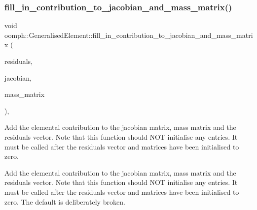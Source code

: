 \subsubsection{\texorpdfstring{fill\+\_\+in\+\_\+contribution\+\_\+to\+\_\+jacobian\+\_\+and\+\_\+mass\+\_\+matrix()}{fill\_in\_contribution\_to\_jacobian\_and\_mass\_matrix()}}
{\footnotesize\ttfamily void oomph\+::\+Generalised\+Element\+::fill\+\_\+in\+\_\+contribution\+\_\+to\+\_\+jacobian\+\_\+and\+\_\+mass\+\_\+matrix (\begin{DoxyParamCaption}\item[{\hyperlink{classoomph_1_1Vector}{Vector}$<$ double $>$ \&}]{residuals,  }\item[{\hyperlink{classoomph_1_1DenseMatrix}{Dense\+Matrix}$<$ double $>$ \&}]{jacobian,  }\item[{\hyperlink{classoomph_1_1DenseMatrix}{Dense\+Matrix}$<$ double $>$ \&}]{mass\+\_\+matrix }\end{DoxyParamCaption})\hspace{0.3cm}{\ttfamily [protected]}, {\ttfamily [virtual]}}



Add the elemental contribution to the jacobian matrix, mass matrix and the residuals vector. Note that this function should N\+OT initialise any entries. It must be called after the residuals vector and matrices have been initialised to zero. 

Add the elemental contribution to the jacobian matrix, mass matrix and the residuals vector. Note that this function should N\+OT initialise any entries. It must be called after the residuals vector and matrices have been initialised to zero. The default is deliberately broken. 

